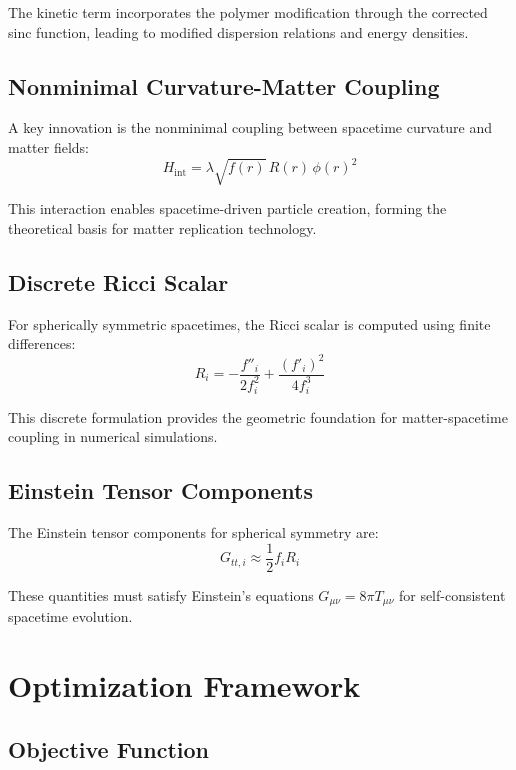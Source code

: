 \documentclass[11pt]{article}
\begin{document}
The kinetic term incorporates the polymer modification through the corrected sinc function, leading to modified dispersion relations and energy densities.

\subsection{Nonminimal Curvature-Matter Coupling}

A key innovation is the nonminimal coupling between spacetime curvature and matter fields:
\begin{equation}
H_{\text{int}} = \lambda\sqrt{f(r)}\,R(r)\,\phi(r)^2
\end{equation}

This interaction enables spacetime-driven particle creation, forming the theoretical basis for matter replication technology.

\subsection{Discrete Ricci Scalar}

For spherically symmetric spacetimes, the Ricci scalar is computed using finite differences:
\begin{equation}
R_i = -\frac{f''_i}{2f_i^2} + \frac{(f'_i)^2}{4f_i^3}
\end{equation}

This discrete formulation provides the geometric foundation for matter-spacetime coupling in numerical simulations.

\subsection{Einstein Tensor Components}

The Einstein tensor components for spherical symmetry are:
\begin{equation}
G_{tt,i} \approx \frac{1}{2}f_i R_i
\end{equation}

These quantities must satisfy Einstein's equations $G_{\mu\nu} = 8\pi T_{\mu\nu}$ for self-consistent spacetime evolution.

\section{Optimization Framework}

\subsection{Objective Function}
\end{document}
